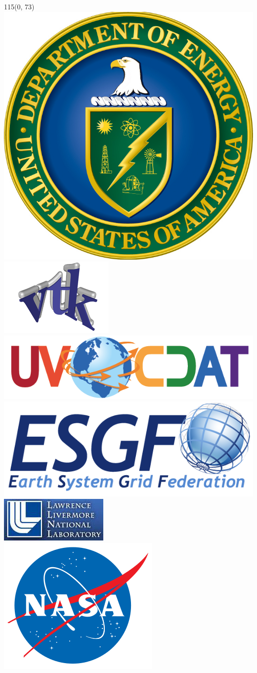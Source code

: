 \documentclass[a0,landscape]{a0poster}
\begin{document}
\begin{textblock}{115}(0, 73)
\includegraphics[height=0.04\hsize]{images/doe-logo}
\hspace{0.3cm}
\includegraphics[height=0.04\hsize]{images/VTK_logo}
\hspace{0.3cm}
\includegraphics[height=0.04\hsize]{images/UV-CDAT_logo}
\hspace{0.3cm}
\includegraphics[height=0.04\hsize]{images/esgf_1}
\hspace{0.3cm}
\includegraphics[height=0.04\hsize]{images/LLNL-Logo}
\hspace{0.3cm}
\includegraphics[height=0.04\hsize]{images/nasa}
\hspace{0.3cm}
\end{textblock}
\end{document}
